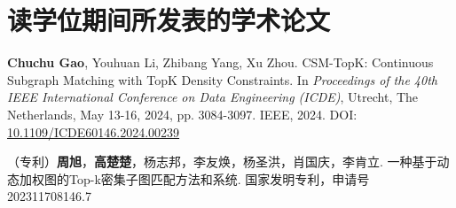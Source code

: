 \chapter{读学位期间所发表的学术论文}

\begin{enumerate}[label={[\arabic*]},leftmargin=*,align=left]
    \item \textbf{Chuchu Gao}, Youhuan Li, Zhibang Yang, Xu Zhou. 
    \textsf{CSM-TopK: Continuous Subgraph Matching with TopK Density Constraints}. 
    In \textit{Proceedings of the 40th IEEE International Conference on Data Engineering (ICDE)}, 
    Utrecht, The Netherlands, May 13-16, 2024, pp. 3084-3097. IEEE, 2024. 
    DOI: \href{https://doi.org/10.1109/ICDE60146.2024.00239}{10.1109/ICDE60146.2024.00239}
    
    \item （专利）\textbf{周旭}，\textbf{高楚楚}，杨志邦，李友焕，杨圣洪，肖国庆，李肯立. 
    \textsf{一种基于动态加权图的Top-k密集子图匹配方法和系统}. 
    国家发明专利，申请号 202311708146.7
\end{enumerate}
